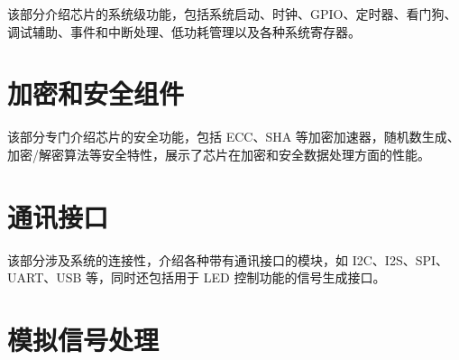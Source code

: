 \documentclass[openany, 10pt]{book}
\begin{document}
该部分介绍芯片的系统级功能，包括系统启动、时钟、GPIO、定时器、看门狗、调试辅助、事件和中断处理、低功耗管理以及各种系统寄存器。







\part{加密和安全组件}

该部分专门介绍芯片的安全功能，包括 ECC、SHA 等加密加速器，随机数生成、加密/解密算法等安全特性，展示了芯片在加密和安全数据处理方面的性能。






\part{通讯接口}


该部分涉及系统的连接性，介绍各种带有通讯接口的模块，如 I2C、I2S、SPI、UART、USB 等，同时还包括用于 LED 控制功能的信号生成接口。







\part{模拟信号处理}

\end{document}
